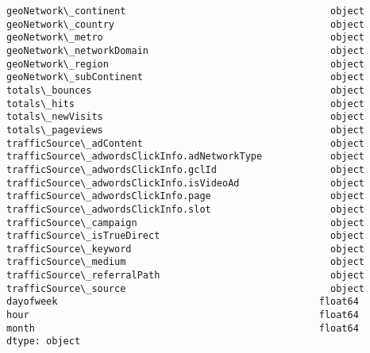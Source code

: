 \documentclass[11pt]{article}
\begin{document}
\begin{Verbatim}[commandchars=\\\{\}]
geoNetwork\_continent                                    object
geoNetwork\_country                                      object
geoNetwork\_metro                                        object
geoNetwork\_networkDomain                                object
geoNetwork\_region                                       object
geoNetwork\_subContinent                                 object
totals\_bounces                                          object
totals\_hits                                             object
totals\_newVisits                                        object
totals\_pageviews                                        object
trafficSource\_adContent                                 object
trafficSource\_adwordsClickInfo.adNetworkType            object
trafficSource\_adwordsClickInfo.gclId                    object
trafficSource\_adwordsClickInfo.isVideoAd                object
trafficSource\_adwordsClickInfo.page                     object
trafficSource\_adwordsClickInfo.slot                     object
trafficSource\_campaign                                  object
trafficSource\_isTrueDirect                              object
trafficSource\_keyword                                   object
trafficSource\_medium                                    object
trafficSource\_referralPath                              object
trafficSource\_source                                    object
dayofweek                                              float64
hour                                                   float64
month                                                  float64
dtype: object

    \end{Verbatim}
\end{document}
